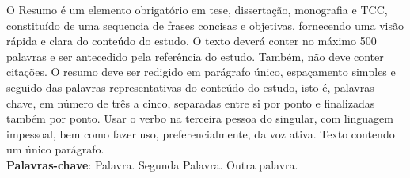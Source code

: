 
\begin{resumo}[RESUMO]
\begin{SingleSpacing}


O Resumo é um elemento obrigatório em tese, dissertação, monografia e TCC, constituído de uma sequencia de frases concisas e objetivas, fornecendo uma visão rápida e clara do conteúdo do estudo. O texto deverá conter no máximo 500 palavras e ser antecedido
pela referência do estudo. Também, não deve conter citações. O resumo deve ser redigido em parágrafo único, espaçamento simples e seguido das palavras representativas do conteúdo do estudo, isto é, palavras-chave, em número de três a cinco, separadas entre si por ponto e finalizadas também por ponto. Usar o verbo na terceira pessoa do singular, com linguagem impessoal, bem como fazer uso, preferencialmente, da voz ativa. Texto contendo um único parágrafo.\\

\textbf{Palavras-chave}: Palavra. Segunda Palavra. Outra palavra.

\end{SingleSpacing}
\end{resumo}


